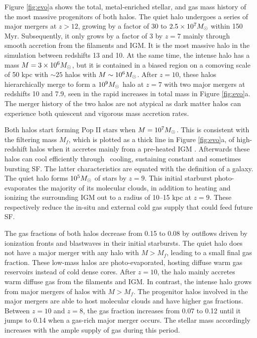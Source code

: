 \documentclass[apj]{emulateapj}
\begin{document}

Figure \ref{fig:evo}a shows the total, metal-enriched stellar, and gas
mass history of the most massive progenitors of both halos.  The quiet
halo undergoes a series of major mergers at $z > 12$, growing by a
factor of 30 to $2.5 \times 10^7 \Ms$ within 150 Myr.  Subsequently,
it only grows by a factor of 3 by $z=7$ mainly through smooth
accretion from the filaments and IGM.  It is the most massive halo in
the simulation between redshifts 13 and 10.  At the same time, the
intense halo has a mass $M = 3 \times 10^6 \Ms$, but it is contained
in a biased region on a comoving scale of 50 kpc with $\sim25$ halos
with $M \sim 10^6 \Ms$.  After $z=10$, these halos hierarchically
merge to form a $10^9 \Ms$ halo at $z=7$ with two major mergers at
redshifts 10 and 7.9, seen in the rapid increases in total mass in
Figure \ref{fig:evo}a.  The merger history of the two halos are not
atypical as dark matter halos can experience both quiescent and
vigorous mass accretion rates.

Both halos start forming Pop II stars when $M = 10^7 \Ms$.  This is
consistent with the filtering mass $M_f$, which is plotted as a thick
line in Figure \ref{fig:evo}a, of high-redshift halos when it accretes
mainly from a pre-heated IGM \citep{gnedin98, gnedin00, Wise08_Gal}.
Afterwards these halos can cool efficiently through \hh~cooling,
sustaining constant and sometimes bursting SF.  The latter
characteristics are equated with the definition of a galaxy.  The
quiet halo forms $10^5 \Ms$ of stars by $z=9$.  This initial starburst
photo-evaporates the majority of its molecular clouds, in addition to
heating and ionizing the surrounding IGM out to a radius of 10--15 kpc
at $z=9$.  These respectively reduce the in-situ and external cold gas
supply that could feed future SF.

The gas fractions of both halos decrease from 0.15 to 0.08 by outflows
driven by ionization fronts and blastwaves in their initial
starbursts.  The quiet halo does not have a major merger with any halo
with $M > M_f$, leading to a small final gas fraction.  These low-mass
halos are photo-evaporated, hosting diffuse warm gas reservoirs
instead of cold dense cores.  After $z=10$, the halo mainly accretes
warm diffuse gas from the filaments and IGM.  In contrast, the intense
halo grows from major mergers of halos with $M > M_f$.  The progenitor
halos involved in the major mergers are able to host molecular clouds
and have higher gas fractions.  Between $z=10$ and $z=8$, the gas
fraction increases from 0.07 to 0.12 until it jumps to 0.14 when a
gas-rich major merger occurs.  The stellar mass accordingly increases
with the ample supply of gas during this period.  
\end{document}
